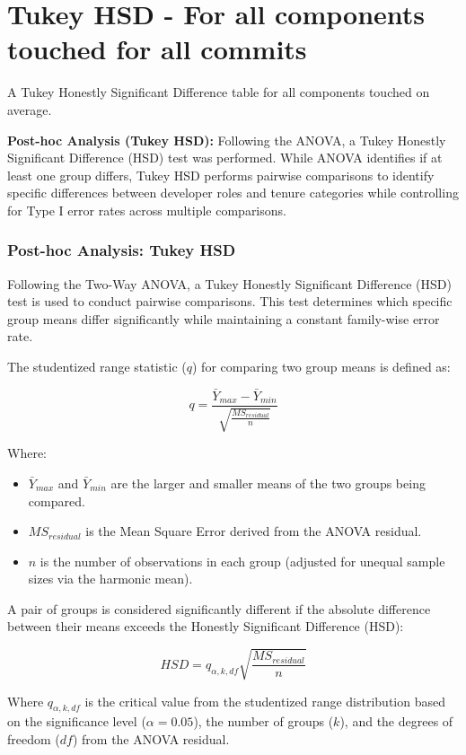 \section{Tukey HSD - For all components touched for all commits} 
A Tukey Honestly Significant Difference table for all components touched on average. 

\textbf{Post-hoc Analysis (Tukey HSD):}
Following the ANOVA, a Tukey Honestly Significant Difference (HSD) test was performed. 
While ANOVA identifies if at least one group differs, Tukey HSD performs pairwise 
comparisons to identify specific differences between developer roles and tenure 
categories while controlling for Type I error rates across multiple comparisons.
\label{sec:codebase_graph_latex.repository_graph.component_time_series.tukey_hsd} 



\subsubsection*{Post-hoc Analysis: Tukey HSD}
Following the Two-Way ANOVA, a Tukey Honestly Significant Difference (HSD) test 
is used to conduct pairwise comparisons. This test determines which specific 
group means differ significantly while maintaining a constant family-wise 
error rate.

The studentized range statistic ($q$) for comparing two group means is defined as:

\begin{equation}
    q = \frac{\bar{Y}_{max} - \bar{Y}_{min}}{\sqrt{\frac{MS_{residual}}{n}}}
\end{equation}

Where:
\begin{itemize}
    \item $\bar{Y}_{max}$ and $\bar{Y}_{min}$ are the larger and smaller means of the two groups being compared.
    \item $MS_{residual}$ is the Mean Square Error derived from the ANOVA residual.
    \item $n$ is the number of observations in each group (adjusted for unequal sample sizes via the harmonic mean).
\end{itemize}

A pair of groups is considered significantly different if the absolute difference 
between their means exceeds the Honestly Significant Difference (HSD):

\begin{equation}
    HSD = q_{\alpha, k, df} \sqrt{\frac{MS_{residual}}{n}}
\end{equation}

Where $q_{\alpha, k, df}$ is the critical value from the studentized range 
distribution based on the significance level ($\alpha = 0.05$), the number 
of groups ($k$), and the degrees of freedom ($df$) from the ANOVA residual.

\newpage 
